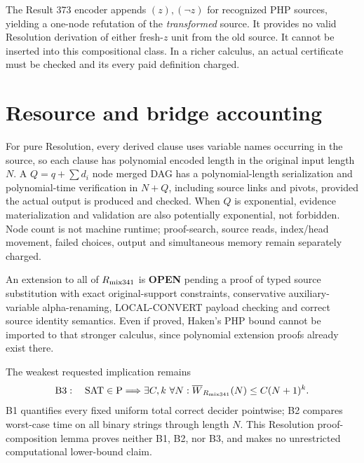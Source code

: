\documentclass[11pt]{article}
\begin{document}
The Result 373 encoder appends $(z),(\neg z)$ for recognized PHP sources, yielding a one-node refutation of the \emph{transformed} source. It provides no valid Resolution derivation of either fresh-$z$ unit from the old source. It cannot be inserted into this compositional class. In a richer calculus, an actual certificate must be checked and its every paid definition charged.

\section*{Resource and bridge accounting}
For pure Resolution, every derived clause uses variable names occurring in the source, so each clause has polynomial encoded length in the original input length $N$. A $Q=q+\sum d_i$ node merged DAG has a polynomial-length serialization and polynomial-time verification in $N+Q$, including source links and pivots, provided the actual output is produced and checked. When $Q$ is exponential, evidence materialization and validation are also potentially exponential, not forbidden. Node count is not machine runtime; proof-search, source reads, index/head movement, failed choices, output and simultaneous memory remain separately charged.

An extension to all of $R_{\rm mix341}$ is \textbf{OPEN} pending a proof of typed source substitution with exact original-support constraints, conservative auxiliary-variable alpha-renaming, LOCAL-CONVERT payload checking and correct source identity semantics. Even if proved, Haken's PHP bound cannot be imported to that stronger calculus, since polynomial extension proofs already exist there.

The weakest requested implication remains
\[
{\rm B3}:\quad {\rm SAT}\in{\rm P}\Longrightarrow
\exists C,k\ \forall N:\overline W_{R_{\rm mix341}}(N)\le C(N+1)^k.
\]
B1 quantifies every fixed uniform total correct decider pointwise; B2 compares worst-case time on all binary strings through length $N$. This Resolution proof-composition lemma proves neither B1, B2, nor B3, and makes no unrestricted computational lower-bound claim.
\end{document}
